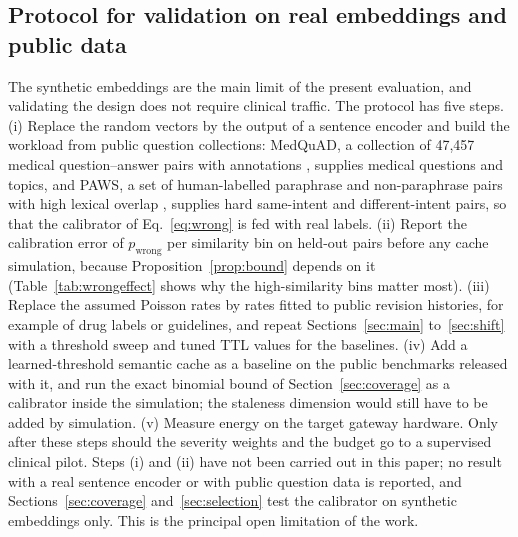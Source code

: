 \documentclass[journal]{IEEEtran}
\begin{document}
\subsection{Protocol for validation on real embeddings and public data}\label{sec:protocol}
The synthetic embeddings are the main limit of the present evaluation, and validating the design does not require clinical traffic. The protocol has five steps. (i) Replace the random vectors by the output of a sentence encoder \cite{reimers2019} and build the workload from public question collections: MedQuAD, a collection of 47,457 medical question--answer pairs with annotations \cite{benabacha2019}, supplies medical questions and topics, and PAWS, a set of human-labelled paraphrase and non-paraphrase pairs with high lexical overlap \cite{zhang2019}, supplies hard same-intent and different-intent pairs, so that the calibrator of Eq.~\eqref{eq:wrong} is fed with real labels. (ii) Report the calibration error of $p_{\text{wrong}}$ per similarity bin on held-out pairs before any cache simulation, because Proposition~\ref{prop:bound} depends on it (Table~\ref{tab:wrongeffect} shows why the high-similarity bins matter most). (iii) Replace the assumed Poisson rates by rates fitted to public revision histories, for example of drug labels or guidelines, and repeat Sections~\ref{sec:main} to~\ref{sec:shift} with a threshold sweep and tuned TTL values for the baselines. (iv) Add a learned-threshold semantic cache \cite{schroeder2026} as a baseline on the public benchmarks released with it, and run the exact binomial bound of Section~\ref{sec:coverage} as a calibrator inside the simulation; the staleness dimension would still have to be added by simulation. (v) Measure energy on the target gateway hardware. Only after these steps should the severity weights and the budget go to a supervised clinical pilot. Steps (i) and (ii) have not been carried out in this paper; no result with a real sentence encoder or with public question data is reported, and Sections~\ref{sec:coverage} and~\ref{sec:selection} test the calibrator on synthetic embeddings only. This is the principal open limitation of the work.
\end{document}
